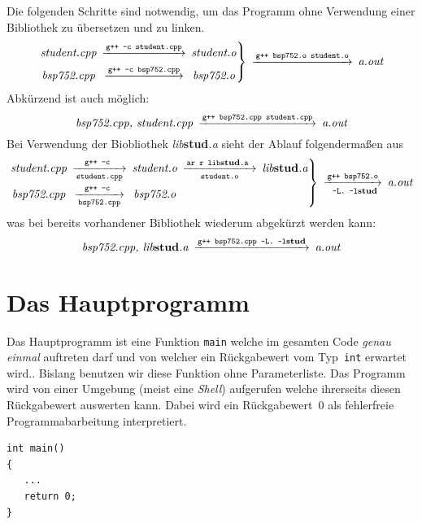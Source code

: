 %
Die folgenden Schritte sind notwendig, um das Programm ohne
Verwendung einer Bibliothek zu \"ubersetzen und zu linken.
\[
\begin{CD}
  \left.
  \begin{CD}
   \textit{student.cpp} @>\texttt{g++ -c student.cpp}>> \textit{student.o}
   \\
   \textit{bsp752.cpp} @>\texttt{g++ -c bsp752.cpp}>> \textit{bsp752.o}
  \end{CD}
  \right\}
  @>\texttt{g++ bsp752.o student.o}>> \textit{a.out}
\end{CD}
\]
Abk\"urzend ist auch m\"oglich:
\[
  \begin{CD}
   \textit{bsp752.cpp, student.cpp} @>\texttt{g++ bsp752.cpp student.cpp}>> \textit{a.out}
  \end{CD}
\]
Bei Verwendung der Biobliothek \textit{lib}\textbf{stud}\textit{.a} sieht der
Ablauf folgenderma{\ss}en aus
\[
\begin{CD}
  \left.
  \begin{CD}
   \textit{student.cpp} @>\texttt{g++ -c }>\texttt{student.cpp}> \textit{student.o}
   @>\texttt{ar r lib}\textbf{stud}\texttt{.a }>\texttt{student.o}>
   \textit{lib}\textbf{stud}\textit{.a}
   \\
   \textit{bsp752.cpp} @>\texttt{g++ -c }>\texttt{bsp752.cpp}> \textit{bsp752.o}
  \end{CD}
  \right\}
  @>\texttt{g++ bsp752.o}>\texttt{ -L. -l}\textbf{stud}> \textit{a.out}
\end{CD}
\]
was bei bereits vorhandener Bibliothek wiederum abgek\"urzt werden kann:
\[
\begin{CD}
   \textit{bsp752.cpp, }\textit{lib}\textbf{stud}\textit{.a}
    @>\texttt{g++ bsp752.cpp -L. -l}\textbf{stud}>> \textit{a.out}
\end{CD}
\]
%
%
%
%
\section{Das Hauptprogramm}
\label{p:7.6}
%
\begin{minipage}[t] {0.75\textwidth}
Das Hauptprogramm
ist eine Funktion \verb|main| welche im gesamten Code \emph{genau einmal} auftreten darf
und von welcher ein Rückgabewert vom Typ~\verb|int| erwartet wird..
Bislang benutzen wir diese Funktion ohne Parameterliste.
Das Programm wird von einer Umgebung (meist eine \emph{Shell}) aufgerufen welche
ihrerseits diesen Rückgabewert auswerten kann. Dabei wird ein
Rückgabewert~0 als fehlerfreie Programmabarbeitung interpretiert.
\end{minipage}
\hfill
\begin{minipage}[t] {0.2\textwidth}
\begin{verbatim}
int main()
{
   ...
   return 0;
}
\end{verbatim}
\end{minipage}


